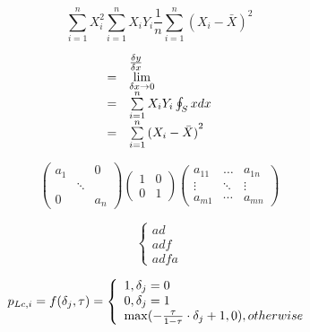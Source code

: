 \begin{equation}
\sum\limits_{i = 1}^n {X_i^2} \sum\limits_{i = 1}^n {{X_i}{Y_i}} \frac{1}{n}\sum\limits_{i = 1}^n {{{({X_i} - \bar X)}^2}}       
\end{equation}

\begin{equation}
\begin{array}{lllll}
 & \frac{{\delta y}}{{\delta x}}\\
{\rm{ = }} & \mathop {\lim }\limits_{\delta x \to 0} \\
{\rm{ = }} & \sum\limits_{i = 1}^n {{X_i}{Y_i}} \oint_S x dx\\
{\rm{ = }} & \sum\limits_{i = 1}^n {{{({X_i} - \bar X)}^2}} 
\end{array}
\end{equation}           %

\[\left( {\begin{array}{*{20}{c}}
{{a_1}}&{}&0\\
{}& \ddots &{}\\
0&{}&{{a_n}}
\end{array}} \right)\left( {\begin{array}{*{20}{c}}
1&0\\
0&1
\end{array}} \right)\left( {\begin{array}{*{20}{c}}
{{a_{11}}}& \ldots &{{a_{1n}}}\\
 \vdots & \ddots & \vdots \\
{{a_{m1}}}& \cdots &{{a_{mn}}}
\end{array}} \right)\]


\[\left\{ \begin{array}{l}
ad\\
adf\\
adfa
\end{array} \right.\]

\begin{equation}
{p_{Lc,i}} = f({\delta _j},\tau ) = \left\{ \begin{array}{l}
1    ,{\delta _j} = 0\\
0   , {\delta _j} = 1\\
\max ( - \frac{\tau }{{1 - \tau }} \cdot {\delta _j} + 1,0){\rm{     }},otherwise{\rm{ }}
\end{array} \right.
\end{equation} 


